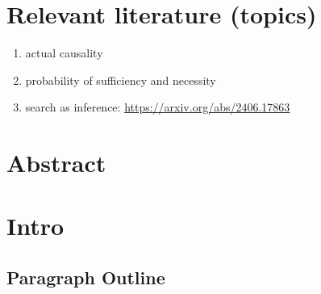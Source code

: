 \documentclass{article}
\begin{document}
\section{Relevant literature (topics)}


\begin{enumerate}

\item actual causality


\item probability of sufficiency and necessity

\item search as inference: \url{https://arxiv.org/abs/2406.17863}


\end{enumerate}

\section{Abstract}

\section{Intro}

\subsection{Paragraph Outline}
\end{document}
